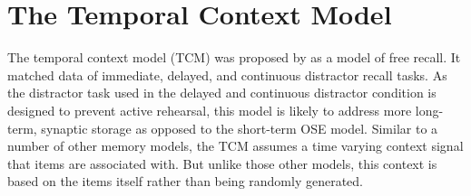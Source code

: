 \chapter{The Temporal Context Model}\label{sec:tcm}
The temporal context model (TCM) was proposed by \textcite{Howard2002} as a model of free recall.
It matched data of immediate, delayed, and continuous distractor recall tasks.
As the distractor task used in the delayed and continuous distractor condition is designed to prevent active rehearsal, this model is likely to address more long-term, synaptic storage as opposed to the short-term OSE model.
Similar to a number of other memory models, the TCM assumes a time varying context signal that items are associated with.
But unlike those other models, this context is based on the items itself rather than being randomly generated.

